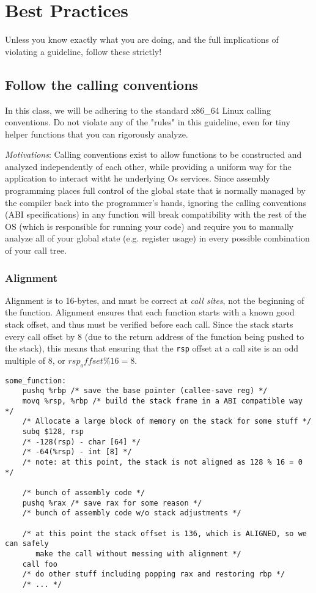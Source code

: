 \documentclass[11pt]{article}
\begin{document}
\section{Best Practices}

Unless you know exactly what you are doing, and the full implications of violating a
guideline, follow these strictly!

\subsection{Follow the calling conventions}

In this class, we will be adhering to the standard x86\_64 Linux calling conventions. Do
not violate any of the "rules" in this guideline, even for tiny helper functions that you
can rigorously analyze.

\emph{Motivations}: Calling conventions exist to allow functions to be constructed and
analyzed independently of each other, while providing a uniform way for the application to
interact witht he underlying Os services. Since assembly programming places full control
of the global state that is normally managed by the compiler back into the programmer's
hands, ignoring the calling conventions (ABI specifications) in any function will break
compatibility with the rest of the OS (which is responsible for running your code) and
require you to manually analyze all of your global state (e.g. register usage) in every
possible combination of your call tree.


\subsubsection{Alignment} Alignment is to 16-bytes, and must be correct at \emph{call
sites}, not the beginning of the function. Alignment ensures that each function starts
with a known good stack offset, and thus must be verified before each call. Since the
stack starts every call offset by 8 (due to the return address of the function being
pushed to the stack), this means that ensuring that the \texttt{rsp} offset at a call site
is an odd multiple of 8, or $rsp_offset \% 16 = 8$.

\begin{lstlisting}[caption={Proper alignment at call sites}, captionpos=b]
some_function:
    pushq %rbp /* save the base pointer (callee-save reg) */
    movq %rsp, %rbp /* build the stack frame in a ABI compatible way */
    /* Allocate a large block of memory on the stack for some stuff */
    subq $128, rsp
    /* -128(rsp) - char [64] */
    /* -64(%rsp) - int [8] */
    /* note: at this point, the stack is not aligned as 128 % 16 = 0 */

    /* bunch of assembly code */
    pushq %rax /* save rax for some reason */
    /* bunch of assembly code w/o stack adjustments */

    /* at this point the stack offset is 136, which is ALIGNED, so we can safely
       make the call without messing with alignment */
    call foo
    /* do other stuff including popping rax and restoring rbp */
    /* ... */
\end{lstlisting}
\end{document}
